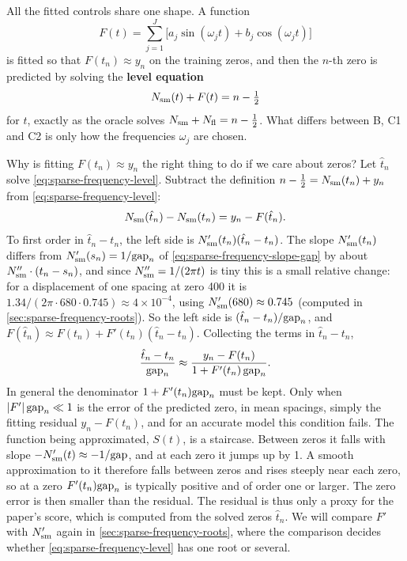 All the fitted controls share one shape. A function
\begin{equation}
F(t)=\sum_{j=1}^{J}\bigl[a_j\sin(\omega_j t)+b_j\cos(\omega_j t)\bigr]
\label{eq:sparse-frequency-model}
\end{equation}
is fitted so that $F(t_n)\approx y_n$ on the training zeros, and then the $n$-th zero is predicted by solving the \textbf{level equation}
\begin{equation}
N_{\mathrm{sm}}(t)+F(t)=n-\tfrac12
\label{eq:sparse-frequency-level}
\end{equation}
for $t$, exactly as the oracle solves $N_{\mathrm{sm}}+N_{\mathrm{fl}}=n-\tfrac12$. What differs between B, C1 and C2 is only how the frequencies $\omega_j$ are chosen.

Why is fitting $F(t_n)\approx y_n$ the right thing to do if we care about zeros? Let $\hat t_n$ solve \eqref{eq:sparse-frequency-level}. Subtract the definition $n-\tfrac12=N_{\mathrm{sm}}(t_n)+y_n$ from \eqref{eq:sparse-frequency-level}:
\begin{equation}
N_{\mathrm{sm}}(\hat t_n)-N_{\mathrm{sm}}(t_n)=y_n-F(\hat t_n).
\end{equation}
To first order in $\hat t_n-t_n$, the left side is $N_{\mathrm{sm}}'(t_n)(\hat t_n-t_n)$. The slope $N_{\mathrm{sm}}'(t_n)$ differs from $N_{\mathrm{sm}}'(s_n)=1/\mathrm{gap}_n$ of \eqref{eq:sparse-frequency-slope-gap} by about $N_{\mathrm{sm}}''\cdot(t_n-s_n)$, and since $N_{\mathrm{sm}}''=1/(2\pi t)$ is tiny this is a small relative change: for a displacement of one spacing at zero 400 it is $1.34/(2\pi\cdot680\cdot0.745)\approx4\times10^{-4}$, using $N_{\mathrm{sm}}'(680)\approx0.745$ (computed in \cref{sec:sparse-frequency-roots}). So the left side is $(\hat t_n-t_n)/\mathrm{gap}_n$, and $F(\hat t_n)\approx F(t_n)+F'(t_n)(\hat t_n-t_n)$. Collecting the terms in $\hat t_n-t_n$,
\begin{equation}
\frac{\hat t_n-t_n}{\mathrm{gap}_n}\approx\frac{y_n-F(t_n)}{1+F'(t_n)\,\mathrm{gap}_n}.
\label{eq:sparse-frequency-errorlink}
\end{equation}
In general the denominator $1+F'(t_n)\mathrm{gap}_n$ must be kept. Only when $\left\lvert F'\right\rvert\mathrm{gap}_n\ll1$ is the error of the predicted zero, in mean spacings, simply the fitting residual $y_n-F(t_n)$, and for an accurate model this condition fails. The function being approximated, $S(t)$, is a staircase. Between zeros it falls with slope $-N_{\mathrm{sm}}'(t)\approx-1/\mathrm{gap}$, and at each zero it jumps up by 1. A smooth approximation to it therefore falls between zeros and rises steeply near each zero, so at a zero $F'(t_n)\mathrm{gap}_n$ is typically positive and of order one or larger. The zero error is then smaller than the residual. The residual is thus only a proxy for the paper's score, which is computed from the solved zeros $\hat t_n$. We will compare $F'$ with $N_{\mathrm{sm}}'$ again in \cref{sec:sparse-frequency-roots}, where the comparison decides whether \eqref{eq:sparse-frequency-level} has one root or several.

